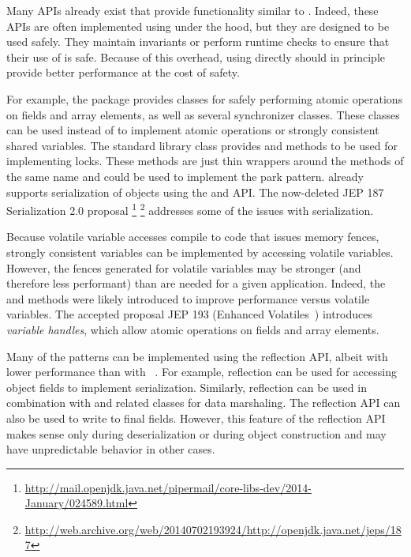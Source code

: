 Many APIs already exist that provide functionality similar to \unsafe{}.
Indeed, these APIs are often implemented using \unsafe{} under the hood, but 
they are designed to be used safely.
They maintain invariants or perform runtime checks
to ensure that their use of \unsafe{} is safe.
Because of this overhead, using \unsafe{}
directly should in principle provide better performance at the cost of safety.

For example,
the  package provides classes 
for safely performing atomic operations on fields and array elements, as well
as several synchronizer classes. These
classes
can be used instead of \unsafe{} to implement
atomic operations or strongly consistent
shared variables.
The standard library class
 provides
 and 
methods to be used for implementing locks. 
These methods are just thin wrappers
around the \smu{} methods of the same name and 
could be used to implement the park pattern.
\java{} already supports serialization of objects using the
 and
 API.
The now-deleted JEP 187 Serialization 2.0 proposal%
\footnote{\url{http://mail.openjdk.java.net/pipermail/core-libs-dev/2014-January/024589.html}}
\footnote{\url{http://web.archive.org/web/20140702193924/http://openjdk.java.net/jeps/187}}
addresses some of the issues with \java{} serialization.

Because volatile variable accesses compile to code that issues memory fences, 
strongly consistent variables can be implemented by accessing volatile variables.
However, the fences generated for volatile variables may be stronger (and
therefore less performant) than are needed for a given application.
Indeed, the \unsafe{} 
and  methods were likely introduced
to improve performance versus volatile variables.
The accepted proposal JEP 193 (Enhanced Volatiles~\citep{jep193}) introduces \emph{variable handles}, which allow
atomic operations on fields and array elements.

Many of the patterns can be implemented using the reflection API,
albeit with lower performance than with \unsafe{}~\citep{korlandNoninvasiveConcurrencyJava2010}.
For example,
reflection can be used for accessing object fields to implement serialization.
Similarly, reflection can be used
in combination with
 and related classes for
data marshaling.
The reflection API can also be used to write to final fields.
However, this feature of the reflection API 
makes sense only during deserialization or during object construction and may have
unpredictable behavior in other cases.

